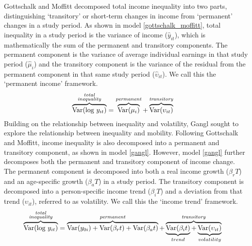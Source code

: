 \documentclass[12pt]{article}
\begin{document}
Gottschalk and Moffitt \citeyearpar{gottschalk_moffitt_1994} decomposed total income inequality into two parts, distinguishing `transitory' or short-term changes in income from `permanent' changes in a study period. As shown in model \ref{gottschalk_moffitt}, total inequality in a study period is the variance of income ($\hat{y}_{it}$), which is mathematically the sum of the permanent and transitory components. The permanent component is the variance of average individual earnings in that study period ($\hat{\mu}_{i}$) and the transitory component is the variance of the residual from the permanent component in that same study period ($\hat{\upsilon}_{it}$). We call this the `permanent income' framework.
\begin{align}
\overbrace{\mbox{Var(log }y_{it})}^{\substack{\text{\emph{total}} \\ \text{\emph{inequality}}}} &= \overbrace{\mbox{Var(}\mu_{i})}^{\substack{\text{\emph{permanent}}}} + \overbrace{\mbox{Var(}\upsilon_{it})}^{\substack{\text{\emph{transitory}}}}
\label{gottschalk_moffitt}
\end{align}
Building on the relationship between inequality and volatility, Gangl \citeyearpar{gangl_2005} sought to explore the relationship between inequality and mobility. Following Gottschalk and Moffitt, income inequality is also decomposed into a permanent and transitory component, as shown in model \ref{gangl}. However, model \ref{gangl} further decomposes both the permanent and transitory component of income change. The permanent component is decomposed into both a real income growth ($\beta_{r} T$) and an age-specific growth ($\beta_{a} T$) in a study period. The transitory component is decomposed into a person-specific income trend ($\beta_{i} T$) and a deviation from that trend ($\upsilon_{it}$), referred to as volatility. We call this the `income trend' framework.
\begin{align}
\overbrace{\mbox{Var(log }y_{it})}^{\substack{\text{\emph{total}} \\ \text{\emph{inequality}}}} &= \overbrace{\mbox{Var(}y_{0i}) + \mbox{Var(}\beta_{r}t) + \mbox{Var(}\beta_{a}t)}^{\substack{\text{\emph{permanent}}}} + \overbrace{\underbrace{\mbox{Var(}\beta_{i}t)}_{trend} + \underbrace{\mbox{Var(}\upsilon_{it})}_{volatility}}^{\substack{\text{\emph{transitory}}}}
\label{gangl}
\end{align}
\end{document}
